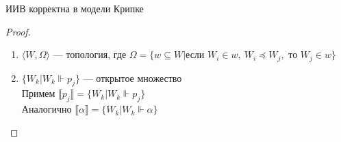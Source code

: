 \documentclass[oneside]{book}
\begin{document}
\begin{theorem}
	ИИВ корректна в модели Крипке
	\label{org90d68f5}
\end{theorem}
\begin{proof}
	\begin{enumerate}
		\item \(\langle W, \Omega \rangle\) --- топология, где \(\Omega = \{w \subseteq W | \text{если }W_i \in w,\ W_i \preceq W_j,\text{ то } W_j \in w\}\) \\
		\item \(\{W_k | W_k \Vdash p_j\}\) --- открытое множество \\
		      Примем \(\llbracket p_j \rrbracket = \{W_k | W_k \Vdash p_j\}\) \\
		      Аналогично \(\llbracket \alpha \rrbracket = \{W_k | W_k \Vdash \alpha\}\)
	\end{enumerate}
\end{proof}
\end{document}

